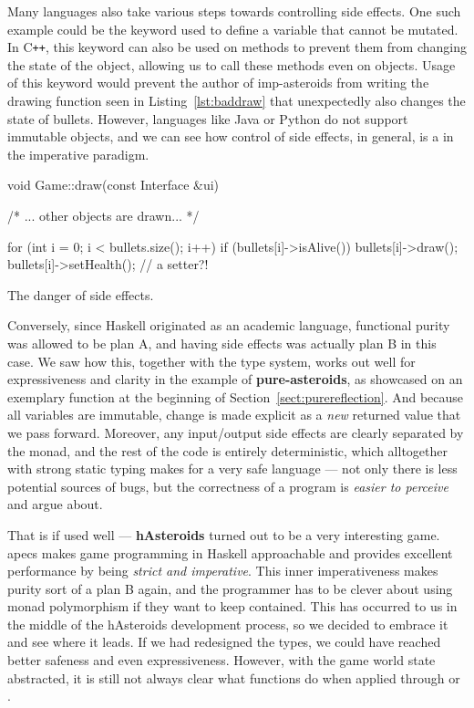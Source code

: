 \documentclass[
  digital, %
  color,   %
  table,   %
  oneside, %
  lof,     %
  lot,     %
]{fithesis3}
\newcommand{\cpp}{C\nolinebreak\texttt{+}\nolinebreak\texttt{+}}
\begin{document}
{Many languages also take various steps towards controlling side effects.
One such example could be the  keyword used to define a variable
that cannot be mutated. In \cpp{}, this keyword can also be used on methods
to prevent them from changing the state of the object, allowing us to call these
methods even on  objects. Usage of this keyword would prevent
the author of imp-asteroids from writing the drawing function seen in Listing~\ref{lst:baddraw} that
unexpectedly also changes the state of bullets.
However, languages like Java or Python do not support immutable objects,
and we can see how control of side effects, in general, is a  in the imperative paradigm.
\begin{listing}[H]
\begin{cppblock}
void Game::draw(const Interface &ui) {

    /* ... other objects are drawn... */
    
    for (int i = 0; i < bullets.size(); i++) {
        if (bullets[i]->isAlive()) {
            bullets[i]->draw();
            bullets[i]->setHealth(); // a setter?!
        }
    }
}
\end{cppblock}
\caption{The danger of side effects.}
\label{lst:baddraw}
\end{listing}

Conversely, since Haskell originated as an academic language,
functional purity was allowed to be plan A, and having
side effects was actually plan B in this case.
We saw how this, together with the type system, works out well for expressiveness and clarity
in the example of \textbf{pure-asteroids}, as showcased on an exemplary function
at the beginning of Section~\ref{sect:purereflection}.
And because all variables are immutable, change is made explicit as a \emph{new} returned value
that we pass forward.
Moreover, any input/output side effects are clearly separated by the  monad,
and the rest of the code is entirely deterministic, which alltogether with strong static typing
makes for a very safe language --- not only there is less potential sources of bugs, but the
correctness of a program is \emph{easier to perceive} and argue about.

That is if used well --- \textbf{hAsteroids} turned out to be a very interesting game.
apecs makes game programming in Haskell approachable and provides
excellent performance by being \emph{strict and imperative}. This inner imperativeness
makes purity sort of a plan B again, and the programmer has to be clever about using monad polymorphism
if they want to keep  contained. This has occurred to us in the middle
of the hAsteroids development process, so we decided to embrace it and see where it leads.
If we had redesigned the types, we could have reached better safeness and even expressiveness.
However, with the game world state abstracted, it is still not always clear what functions do
when applied through  or .



}
\end{document}
